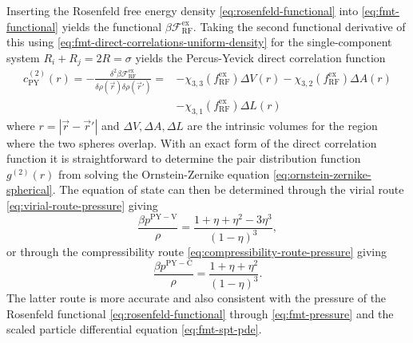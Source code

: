 \begin{tcolorbox}[title=Percus-Yevick theory in hard spheres]
  Inserting the Rosenfeld free energy density \eqref{eq:rosenfeld-functional} into \eqref{eq:fmt-functional} yields the functional $\beta \mathcal{F}_\mathrm{RF}^\mathrm{ex}$.
  Taking the second functional derivative of this using \eqref{eq:fmt-direct-correlations-uniform-density} for the single-component system $R_i + R_j = 2R = \sigma$ yields the Percus-Yevick direct correlation function \cite{RosenfeldJCP1988,WertheimPRL1963}
  \begin{align}
    c^{(2)}_\mathrm{PY}(r)
    =
    - \frac{\delta^2 \beta \mathcal{F}_\mathrm{RF}^\mathrm{ex}}{\delta \rho(\vec{r}) \delta \rho(\vec{r}')}
    =&
    - \chi_{3,3}(f_\mathrm{RF}^\mathrm{ex}) \Delta V(r)
    - \chi_{3,2}(f_\mathrm{RF}^\mathrm{ex}) \Delta A(r)
    \nonumber \\ &
    - \chi_{3,1}(f_\mathrm{RF}^\mathrm{ex}) \Delta L(r)
  \end{align}
  where $r = |\vec{r} - \vec{r}'|$ and $\Delta V, \Delta A, \Delta L$ are the intrinsic volumes for the region where the two spheres overlap.
  With an exact form of the direct correlation function it is straightforward to determine the pair distribution function $g^{(2)}(r)$ from solving the Ornstein-Zernike equation \eqref{eq:ornstein-zernike-spherical}.
  The equation of state can then be determined through the virial route \eqref{eq:virial-route-pressure} giving
  \begin{equation}
    \frac{\beta p^\mathrm{PY-V}}{\rho}
    =
    \frac{1 + \eta + \eta^2 - 3\eta^3}{(1 - \eta)^3},
  \end{equation}
  or through the compressibility route \eqref{eq:compressibility-route-pressure} giving
  \begin{equation}\label{eq:pyc-pressure}
    \frac{\beta p^\mathrm{PY-C}}{\rho}
    =
    \frac{1 + \eta + \eta^2}{(1 - \eta)^3}.
  \end{equation}
  The latter route is more accurate and also consistent with the pressure of the Rosenfeld functional \eqref{eq:rosenfeld-functional} through \eqref{eq:fmt-pressure} and the scaled particle differential equation%
  \eqref{eq:fmt-spt-pde}.
\end{tcolorbox}

